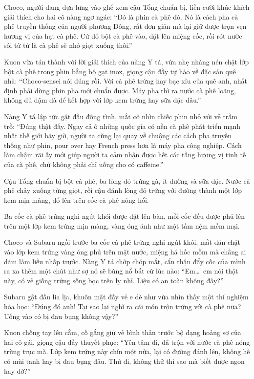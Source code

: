 \documentclass[../main.tex]{subfiles}
\begin{document}
Choco, người đang dựa lưng vào ghế xem cậu Tổng chuẩn bị, liền cười khúc khích giải thích cho hai cô nàng ngơ ngác: ``Đó là phin cà phê đó. Nó là cách pha cà phê truyền thống của người phương Đông, rất đơn giản mà lại giữ được trọn vẹn hương vị của hạt cà phê. Cứ đổ bột cà phê vào, đặt lên miệng cốc, rồi rót nước sôi từ từ là cà phê sẽ nhỏ giọt xuống thôi.''

Kuon vừa tán thành với lời giải thích của nàng Y tá, vừa nhẹ nhàng nén chặt lớp bột cà phê trong phin bằng bộ gạt inox, giọng cậu đầy tự hào về đặc sản quê nhà: ``Choco-sensei nói đúng rồi. Với cà phê trứng hay bạc xỉu của quê anh, nhất định phải dùng phin pha mới chuẩn được. Máy pha thì ra nước cà phê loãng, không đủ đậm đà để kết hợp với lớp kem trứng hay sữa đặc đâu.''

Nàng Y tá lập tức gật đầu đồng tình, mắt cô nhìn chiếc phin nhỏ với vẻ trầm trồ: ``Đúng thật đấy. Ngay cả ở những quốc gia có nền cà phê phát triển mạnh nhất thế giới bây giờ, người ta cũng lại quay về chuộng các cách pha truyền thống như phin, pour over hay French press hơn là máy pha công nghiệp. Cách làm chậm rãi ấy mới giúp người ta cảm nhận được hết các tầng hương vị tinh tế của cà phê, chứ không phải chỉ uống cho có caffeine.''

Cậu Tổng chuẩn bị bột cà phê, ba lòng đỏ trứng gà, ít đường và sữa đặc. Nước cà phê chảy xuống từng giọt, rồi cậu đánh lòng đỏ trứng với đường thành một lớp kem mịn màng, đổ lên trên cốc cà phê nóng hổi.

Ba cốc cà phê trứng nghi ngút khói được đặt lên bàn, mỗi cốc đều được phủ lên trên một lớp kem trứng mịn màng, vàng óng ánh như một tấm nệm mềm mại.

Choco và Subaru ngồi trước ba cốc cà phê trứng nghi ngút khói, mắt dán chặt vào lớp kem trứng vàng óng phủ trên mặt nước, miệng há hốc mồm mà chẳng ai dám làm liều nhấp trước. Nàng Y tá chớp chớp mắt, cẩn thận đẩy cốc của mình ra xa thêm một chút như sợ nó sẽ bùng nổ bất cứ lúc nào: ``Em\dots\ em nói thật này, có vẻ giống trứng sống bọc trên ly nhỉ. Liệu có an toàn không đây?''

Subaru gật đầu lia lịa, khuôn mặt đầy vẻ e dè như vừa nhìn thấy một thí nghiệm hóa học: ``Đúng đó anh! Tại sao lại nghĩ ra cái món trộn trứng với cà phê nữa? Uống vào có bị đau bụng không vậy?''

Kuon chống tay lên cằm, cố gắng giữ vẻ bình thản trước bộ dạng hoảng sợ của hai cô gái, giọng cậu đầy thuyết phục: ``Yên tâm đi, đã trộn với nước cà phê nóng trùng trục mà. Lớp kem trứng này chín một nửa, lại có đường đánh lên, không hề có mùi tanh hay bị đau bụng đâu. Thử đi, không thử thì sao mà biết được ngon hay dở?''
\end{document}
